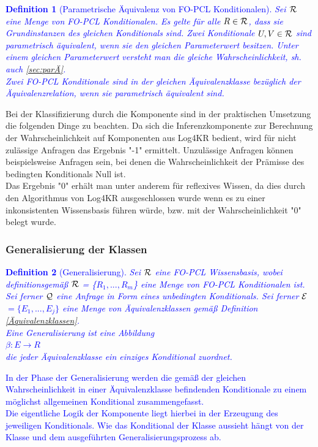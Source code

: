 \documentclass[a4paper, 11pt]{book}
\newtheorem{Def}{Definition }[section]
\begin{document}
\textcolor{blue}{
\begin{Def}[Parametrische Äquivalenz von FO-PCL Konditionalen] \label{Äquivalenz in FO-PCL}  
	Sei $  \cal{R} $ eine Menge von FO-PCL Konditionalen. Es gelte für alle $ R \in \cal{R} $, dass sie Grundinstanzen des gleichen Konditionals sind. Zwei Konditionale $ U,V \in \cal{R} $ sind parametrisch äquivalent, wenn sie den gleichen Parameterwert besitzen. Unter einem gleichen Parameterwert versteht man die gleiche Wahrscheinlichkeit, sh. auch \ref{sec:parÄ}.\\
	Zwei FO-PCL Konditionale sind in der gleichen Äquivalenzklasse bezüglich der Äquivalenzrelation, wenn sie parametrisch äquivalent sind. \label{Äquivalenzklassen} 
\end{Def}
}




Bei der Klassifizierung durch die Komponente sind in der praktischen Umsetzung die folgenden Dinge zu beachten. 
Da sich die Inferenzkomponente zur Berechnung der Wahrscheinlichkeit auf Komponenten aus Log4KR bedient, wird für nicht zulässige Anfragen das Ergebnis "{}-1"{} ermittelt. Unzulässige Anfragen können beispielsweise Anfragen sein, bei denen die Wahrscheinlichkeit der Prämisse des bedingten Konditionals Null ist.\\
Das Ergebnis  "{}0"{} erhält man unter anderem für reflexives Wissen, da dies durch den Algorithmus von Log4KR ausgeschlossen wurde wenn es zu einer inkonsistenten Wissensbasis führen würde, bzw. mit der Wahrscheinlichkeit  "{}0"{} belegt wurde. 
	
	
	
	
\subsubsection{Generalisierung der Klassen}
\textcolor{blue}{
\begin{Def}[Generalisierung] \label{Generalisierung}
	Sei $\cal{R}$ eine FO-PCL Wissensbasis, wobei definitionsgemäß $\cal{R}$  = \{$ R_1, ..., R_m $\} eine Menge von FO-PCL Konditionalen ist. Sei ferner $ \cal{Q} $ eine Anfrage in Form eines unbedingten Konditionals. Sei ferner $ \cal{E}$  $ = \{E_1, ..., E_j\}$ eine Menge von Äquivalenzklassen gemäß Definition \ref{Äquivalenzklassen}.\\
	Eine Generalisierung ist eine Abbildung\\
	\hspace{3.0 cm} $ \beta:  E \rightarrow  R $\\
	die jeder Äquivalenzklasse ein einziges Konditional zuordnet. 
\end{Def}
In der Phase der Generalisierung werden die gemäß der gleichen Wahrscheinlichkeit in einer Äquivalenzklasse befindenden Konditionale zu einem möglichst allgemeinen Konditional zusammengefasst.\\
Die eigentliche Logik der Komponente liegt hierbei in der Erzeugung des jeweiligen Konditionals. Wie das Konditional der Klasse aussieht hängt von der Klasse und dem ausgeführten Generalisierungsprozess ab. }
\end{document}
